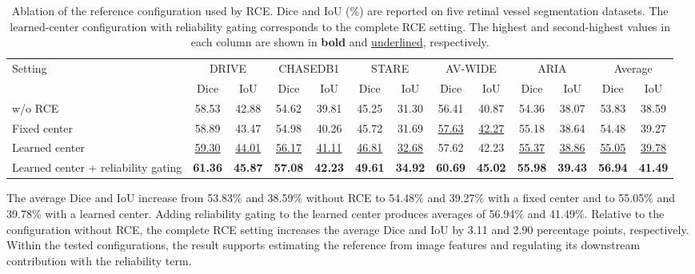 \documentclass[a4paper,fleqn]{cas-sc}
\renewcommand{\arraystretch}{1.08}
\begin{document}
\begin{table}[pos=!htbp]
\centering
\caption{Ablation of the reference configuration used by RCE. Dice and IoU (\%) are reported on five retinal vessel segmentation datasets. The learned-center configuration with reliability gating corresponds to the complete RCE setting. The highest and second-highest values in each column are shown in \textbf{bold} and \underline{underlined}, respectively.}
\label{tab:rce_ablation}
\scriptsize
\setlength{\tabcolsep}{4pt}
\renewcommand{\arraystretch}{1.08}

\begin{adjustbox}{max width=\textwidth,center}
\begin{tabular}{lcccccccccccc}
\toprule
\multirow{2}{*}{Setting}
& \multicolumn{2}{c}{DRIVE}
& \multicolumn{2}{c}{CHASEDB1}
& \multicolumn{2}{c}{STARE}
& \multicolumn{2}{c}{AV-WIDE}
& \multicolumn{2}{c}{ARIA}
& \multicolumn{2}{c}{Average} \\
\cmidrule(lr){2-3}
\cmidrule(lr){4-5}
\cmidrule(lr){6-7}
\cmidrule(lr){8-9}
\cmidrule(lr){10-11}
\cmidrule(lr){12-13}
& Dice & IoU & Dice & IoU & Dice & IoU & Dice & IoU & Dice & IoU & Dice & IoU \\
\midrule
w/o RCE
& 58.53 & 42.88
& 54.62 & 39.81
& 45.25 & 31.30
& 56.41 & 40.87
& 54.36 & 38.07
& 53.83 & 38.59 \\

Fixed center
& 58.89 & 43.47
& 54.98 & 40.26
& 45.72 & 31.69
& \underline{57.63} & \underline{42.27}
& 55.18 & 38.64
& 54.48 & 39.27 \\

Learned center
& \underline{59.30} & \underline{44.01}
& \underline{56.17} & \underline{41.11}
& \underline{46.81} & \underline{32.68}
& 57.62 & 42.23
& \underline{55.37} & \underline{38.86}
& \underline{55.05} & \underline{39.78} \\

Learned center + reliability gating
& \textbf{61.36} & \textbf{45.87}
& \textbf{57.08} & \textbf{42.23}
& \textbf{49.61} & \textbf{34.92}
& \textbf{60.69} & \textbf{45.02}
& \textbf{55.98} & \textbf{39.43}
& \textbf{56.94} & \textbf{41.49} \\
\bottomrule
\end{tabular}
\end{adjustbox}
\end{table}

The average Dice and IoU increase from 53.83\% and 38.59\% without RCE to 54.48\% and 39.27\% with a fixed center and to 55.05\% and 39.78\% with a learned center.
Adding reliability gating to the learned center produces averages of 56.94\% and 41.49\%.
Relative to the configuration without RCE, the complete RCE setting increases the average Dice and IoU by 3.11 and 2.90 percentage points, respectively.
Within the tested configurations, the result supports estimating the reference from image features and regulating its downstream contribution with the reliability term.
\end{document}
